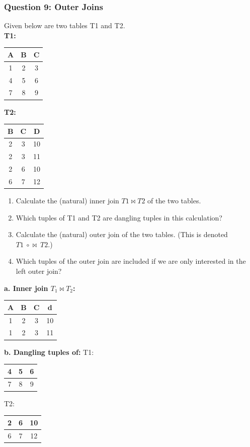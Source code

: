 \subsubsection{Question 9: Outer Joins}
Given below are two tables T1 and T2. \\
\textbf{T1:}
\begin{tabular}{ccc}
A & B & C \\
\hline
1 & 2 & 3 \\
4 & 5 & 6 \\
7 & 8 & 9 \\
\end{tabular}

\textbf{T2:}
\begin{tabular}{ccc}
B & C & D \\
\hline
2 & 3 & 10 \\
2 & 3 & 11 \\
2 & 6 & 10 \\
6 & 7 & 12 \\
\end{tabular}

\begin{enumerate}
    \item[a.] Calculate the (natural) inner join \(T1 \bowtie T2\) of the two tables.
    \item[b.] Which tuples of T1 and T2 are dangling tuples in this calculation?
    \item[c.] Calculate the (natural) outer join of the two tables. (This is denoted \(T1 \ \circ\!\!\bowtie\ T2\).)
    \item[d.] Which tuples of the outer join are included if we are only interested in the left outer join?
\end{enumerate}

\textbf{a. Inner join \(T_1 \bowtie T_2\):} 
\begin{tabular}{|c|c|c|c|}
\hline
A & B & C & d \\
\hline
1 & 2 & 3 & 10\\
\hline
1 & 2 & 3 & 11\\
\hline
\end{tabular}

\textbf{b. Dangling tuples of:} 
T1:
\begin{tabular}{|c|c|c|}
\hline
4 & 5 & 6 \\
\hline
7 & 8 & 9 \\
\hline
\end{tabular}
T2: 
\begin{tabular}{|c|c|c|}
\hline
2 & 6 & 10 \\
\hline
6 & 7 & 12 \\
\hline
\end{tabular}

